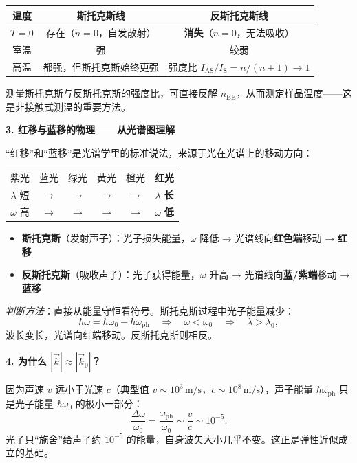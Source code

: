 \begin{insightbox}[物理图像与概念深化]
\begin{center}
\begin{tabular}{ccc}
\toprule
温度 & 斯托克斯线 & 反斯托克斯线 \\
\midrule
$T=0$ & 存在（$n=0$，自发散射） & \textbf{消失}（$n=0$，无法吸收） \\
室温 & 强 & 较弱 \\
高温 & 都强，但斯托克斯始终更强 & 强度比 $I_\text{AS}/I_\text{S}=n/(n+1)\to1$ \\
\bottomrule
\end{tabular}
\end{center}

测量斯托克斯与反斯托克斯的强度比，可直接反解 $n_\mathrm{BE}$，从而测定样品温度——这是非接触式测温的重要方法。

\textbf{3. 红移与蓝移的物理——从光谱图理解}

``红移''和``蓝移''是光谱学里的标准说法，来源于光在光谱上的移动方向：

\begin{center}
\begin{tabular}{cccccc}
\toprule
紫光 & 蓝光 & 绿光 & 黄光 & 橙光 & \textbf{红光} \\
$\lambda$ 短 & $\to$ & $\to$ & $\to$ & $\to$ & $\lambda$ \textbf{长} \\
$\omega$ 高 & $\to$ & $\to$ & $\to$ & $\to$ & $\omega$ \textbf{低} \\
\bottomrule
\end{tabular}
\end{center}

\begin{itemize}
    \item \textbf{斯托克斯}（发射声子）：光子损失能量，$\omega$ 降低 → 光谱线向\textbf{红色端}移动 → \textbf{红移}
    \item \textbf{反斯托克斯}（吸收声子）：光子获得能量，$\omega$ 升高 → 光谱线向\textbf{蓝/紫端}移动 → \textbf{蓝移}
\end{itemize}

\textit{判断方法}：直接从能量守恒看符号。斯托克斯过程中光子能量减少：
\begin{equation}
\hbar\omega = \hbar\omega_0 - \hbar\omega_\mathrm{ph} \quad\Longrightarrow\quad \omega < \omega_0 \quad\Longrightarrow\quad \lambda > \lambda_0,
\end{equation}
波长变长，光谱向红端移动。反斯托克斯则相反。

\textbf{4. 为什么 $|\vec k|\approx|\vec k_0|$？}

因为声速 $v$ 远小于光速 $c$（典型值 $v\sim10^3\,\mathrm{m/s}$，$c\sim10^8\,\mathrm{m/s}$），声子能量 $\hbar\omega_\mathrm{ph}$ 只是光子能量 $\hbar\omega_0$ 的极小一部分：
\begin{equation}
\frac{\Delta\omega}{\omega_0}=\frac{\omega_\mathrm{ph}}{\omega_0}\sim\frac{v}{c}\sim10^{-5}.
\end{equation}
光子只``施舍''给声子约 $10^{-5}$ 的能量，自身波矢大小几乎不变。这正是弹性近似成立的基础。


\end{insightbox}
